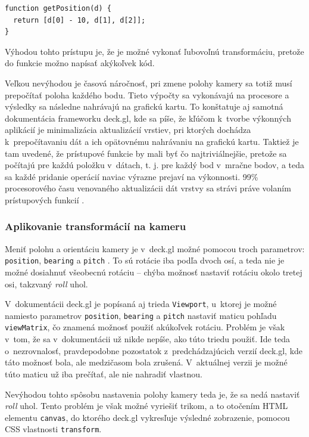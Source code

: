 \begin{lstlisting}
function getPosition(d) {
  return [d[0] - 10, d[1], d[2]];
}
\end{lstlisting}

Výhodou tohto prístupu je, že je možné vykonať ľubovoľnú transformáciu, pretože do funkcie možno napísať akýkoľvek kód.

Veľkou nevýhodou je časová náročnosť, pri zmene polohy kamery sa totiž musí prepočítať poloha každého bodu. Tieto výpočty sa vykonávajú na procesore a výsledky sa následne nahrávajú na grafickú kartu. To konštatuje aj samotná dokumentácia frameworku deck.gl, kde sa píše, že kľúčom k~tvorbe výkonných aplikácií je minimalizácia aktualizácií vrstiev, pri ktorých dochádza k~prepočítavaniu dát a ich opätovnému nahrávaniu na grafickú kartu. Taktiež je tam uvedené, že prístupové funkcie by mali byť čo najtriviálnejšie, pretože sa počítajú pre každú položku v~dátach, t. j. pre každý bod v~mračne bodov, a teda sa každé pridanie operácií naviac výrazne prejaví na výkonnosti. 99\% procesorového času venovaného aktualizácii dát vrstvy sa strávi práve volaním prístupových funkcií \cite{deck.gl_performance_optimization}.

\subsubsection{Aplikovanie transformácií na kameru}

Meniť polohu a orientáciu kamery je v~deck.gl možné pomocou troch parametrov: \texttt{position}, \texttt{bearing} a \texttt{pitch} \cite{deck.gl_documentation}. To sú rotácie iba podľa dvoch osí, a teda nie je možné dosiahnuť všeobecnú rotáciu -- chýba možnosť nastaviť rotáciu okolo tretej osi, takzvaný \emph{roll} uhol.

V~dokumentácii deck.gl je popísaná aj trieda \texttt{Viewport}, u~ktorej je možné namiesto parametrov \texttt{position}, \texttt{bearing} a \texttt{pitch} nastaviť maticu pohľadu \texttt{viewMatrix}, čo znamená možnosť použiť akúkoľvek rotáciu. Problém je však v~tom, že sa v~dokumentácii už nikde nepíše, ako túto triedu použiť. Ide teda o~nezrovnalosť, pravdepodobne pozostatok z~predchádzajúcich verzií deck.gl, kde táto možnosť bola, ale medzičasom bola zrušená. V~aktuálnej verzii je možné túto maticu už iba prečítať, ale nie nahradiť vlastnou.

Nevýhodou tohto spôsobu nastavenia polohy kamery teda je, že sa nedá nastaviť \emph{roll} uhol. Tento problém je však možné vyriešiť trikom, a to otočením HTML elementu \texttt{canvas}, do ktorého deck.gl vykresľuje výsledné zobrazenie, pomocou CSS vlastnosti \texttt{transform}. 

